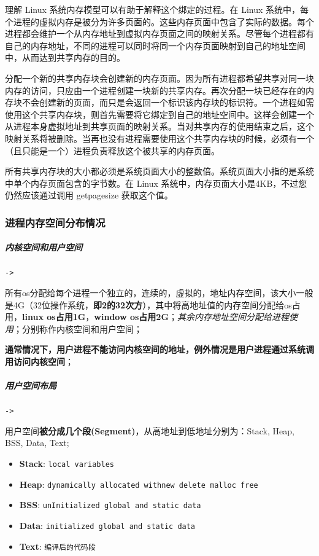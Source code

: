 \documentclass[UTF8,a4paper,8pt]{ctexart}
\begin{document}
			理解 Linux 系统内存模型可以有助于解释这个绑定的过程。在 Linux 系统中，每个进程的虚拟内存是被分为许多页面的。这些内存页面中包含了实际的数据。每个进程都会维护一个从内存地址到虚拟内存页面之间的映射关系。尽管每个进程都有自己的内存地址，不同的进程可以同时将同一个内存页面映射到自己的地址空间中，从而达到共享内存的目的。
			
			分配一个新的共享内存块会创建新的内存页面。因为所有进程都希望共享对同一块内存的访问，只应由一个进程创建一块新的共享内存。再次分配一块已经存在的内存块不会创建新的页面，而只是会返回一个标识该内存块的标识符。一个进程如需使用这个共享内存块，则首先需要将它绑定到自己的地址空间中。这样会创建一个从进程本身虚拟地址到共享页面的映射关系。当对共享内存的使用结束之后，这个映射关系将被删除。当再也没有进程需要使用这个共享内存块的时候，必须有一个（且只能是一个）进程负责释放这个被共享的内存页面。
			
			
			所有共享内存块的大小都必须是系统页面大小的整数倍。系统页面大小指的是系统中单个内存页面包含的字节数。在 Linux 系统中，内存页面大小是4KB，不过您仍然应该通过调用 getpagesize 获取这个值。
		\subsubsection{进程内存空间分布情况}
			\subparagraph{内核空间和用户空间}\verb|->|
				
				所有os分配给每个进程一个独立的，连续的，虚拟的，地址内存空间，该大小一般是4G（32位操作系统，\textbf{即2的32次方}），其中将高地址值的内存空间分配给os占用，\textbf{linux os占用1G}，\textbf{window os占用2G}；\textit{其余内存地址空间分配给进程使用}；分别称作内核空间和用户空间；
				
				\textbf{通常情况下，用户进程不能访问内核空间的地址，例外情况是用户进程通过系统调用访问内核空间}；
			
			\subparagraph{用户空间布局}\verb|->|
			
				用户空间\textbf{被分成几个段(Segment)}，从高地址到低地址分别为：Stack, Heap, BSS, Data, Text;
				
					\begin{itemize}[itemindent = 2em]
						\item \textbf{Stack}:  \verb|local variables|
						\item \textbf{Heap}:	\verb|dynamically allocated withnew delete malloc free|
						\item \textbf{BSS}: \verb|unInitialized global and static data|
						\item \textbf{Data}: \verb|initialized global and static data |
						\item \textbf{Text}: \verb|编译后的代码段|
					\end{itemize}
			
\end{document}

